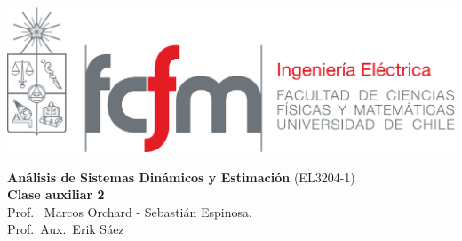 \documentclass[
  11pt,
  letterpaper,
   addpoints,
   answers
  ]{exam}
\begin{document}
\noindent
\begin{minipage}{0.47\textwidth}
\includegraphics[width=\textwidth]{../fcfm_die}
\end{minipage}
\begin{minipage}{0.53\textwidth}
\begin{center}
\large\textbf{Análisis de Sistemas Dinámicos y Estimación} (EL3204-1) \\
\large\textbf{Clase auxiliar 2} \\
\normalsize Prof.~ Marcos Orchard - Sebastián Espinosa.\\
\normalsize Prof.~Aux.~Erik Sáez
\end{center}
\end{minipage}

\vspace{0.5cm}
\noindent
\vspace{.85cm}
\end{document}
